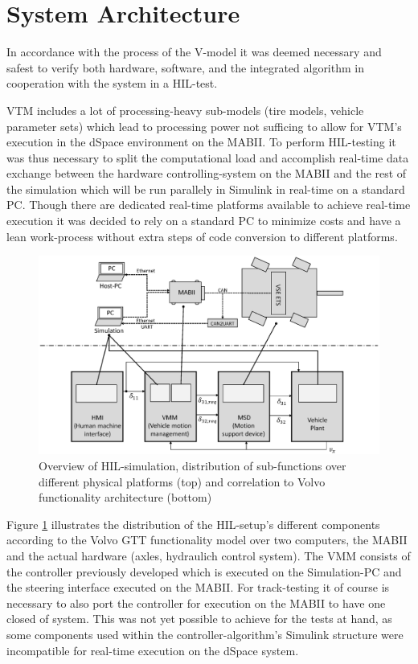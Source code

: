 \documentclass[root.tex]{subfiles}
\begin{document}
{\pagestyle{empty}}
\section{System Architecture}
\label{chap:HiL-Architecture}



In accordance with the process of the V-model it was deemed necessary and safest to verify both hardware, software, and the integrated algorithm in cooperation with the system in a \gls{HIL}-test. 

\gls{VTM} includes a lot of processing-heavy sub-models (tire models, vehicle parameter sets) which lead to processing power not sufficing to allow for \gls{VTM}'s execution in the dSpace environment on the \gls{MABII}. To perform \gls{HIL}-testing it was thus necessary to split the computational load and accomplish real-time data exchange between the hardware controlling-system on the \gls{MABII} and the rest of the simulation which will be run parallely in Simulink in real-time on a standard PC. Though there are dedicated real-time platforms available to achieve real-time execution it was decided to rely on a standard PC to minimize costs and have a lean work-process without extra steps of code conversion to different platforms.


\begin{figure}[tb]
	\centering
	\includegraphics[width=0.8\linewidth]{HIL_overview}
	\caption[Overview of \acrlong{HIL}-simulation, distribution of sub-functions over different physical platforms (top) and correlation to Volvo functionality architecture (bottom)]{Overview of \gls{HIL}-simulation, distribution of sub-functions over different physical platforms (top) and correlation to Volvo functionality architecture (bottom)}
	
	\label{fig:HIL_overview}
\end{figure}

 Figure \ref{fig:HIL_overview} illustrates the distribution of the \gls{HIL}-setup's different components according to the Volvo GTT functionality model over two computers, the \gls{MABII} and the actual hardware (axles, hydraulich control system). The \gls{VMM} consists of the controller previously developed which is executed on the Simulation-PC and the steering interface executed on the \gls{MABII}. For track-testing it of course is necessary to also port the controller for execution on the \gls{MABII} to have one closed of system. This was not yet possible to achieve for the tests at hand, as some components used within the controller-algorithm's  Simulink structure were incompatible for real-time execution on the dSpace system.
\end{document}
